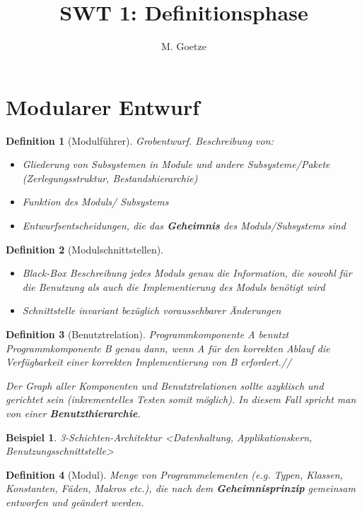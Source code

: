\documentclass[a4paper]{article}
\title{SWT 1: Definitionsphase}
\author{M. Goetze}
\theoremstyle{break}
\newtheorem{defi}{Definition}[section]
\newtheorem{ex}{Beispiel}[section]
\begin{document}
	\maketitle
	\tableofcontents
	\newpage
	
\section{Modularer Entwurf}
\begin{defi}[Modulführer]
	Grobentwurf. Beschreibung von:
	\begin{itemize}
		\item Gliederung von Subsystemen in Module und andere Subsysteme/Pakete (Zerlegungsstruktur, Bestandshierarchie)
		\item Funktion des Moduls/ Subsystems
		\item Entwurfsentscheidungen, die das \textbf{Geheimnis} des Moduls/Subsystems sind
	\end{itemize}
\end{defi}

\begin{defi}[Modulschnittstellen]
	\begin{itemize}
		\item Black-Box Beschreibung jedes Moduls
		\subitem genau die Information, die sowohl für die Benutzung als auch die Implementierung des Moduls benötigt wird
		\item Schnittstelle invariant bezüglich voraussehbarer Änderungen
	\end{itemize}

\end{defi}

\begin{defi}[Benutztrelation]
	Programmkomponente A benutzt Programmkomponente B genau dann, wenn A für den korrekten Ablauf die Verfügbarkeit einer korrekten Implementierung von B erfordert.//
	
	Der Graph aller Komponenten und Benutztrelationen sollte azyklisch und gerichtet sein (inkrementelles Testen somit möglich). In diesem Fall spricht man von einer \textbf{Benutzthierarchie}.
\end{defi}

\begin{ex}
	3-Schichten-Architektur
	<Datenhaltung, Applikationskern, Benutzungsschnittstelle>
\end{ex}

\begin{defi}[Modul]
	Menge von Programmelementen (e.g. Typen, Klassen, Konstanten, Fäden, Makros etc.), die nach dem \textbf{Geheimnisprinzip} gemeinsam entworfen und geändert werden. 
\end{defi}
	
\end{document}
